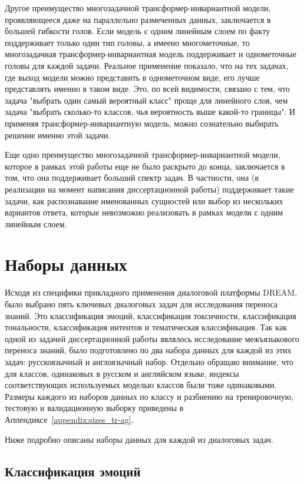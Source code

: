 Другое преимущество многозадачной трансформер-инвариантной модели, проявляющееся даже на параллельно размеченных данных, заключается в большей гибкости голов. Если модель с одним линейным слоем по факту поддерживает только один тип головы, а имеено многометочные, то многозадачная трансформер-инвариантная модель поддерживает и однометочные головы для каждой задачи. Реальное применение показало, что на тех задачах, где выход модели можно представить в однометочном виде, его лучше представлять именно  в таком виде. Это, по всей видимости, связано с тем, что задача "выбрать один самый вероятный класс" проще для линейного слоя, чем задача "выбрать сколько-то классов, чья вероятность выше какой-то границы". И применяя трансформер-инвариантную модель, можно сознательно выбирать решение именно этой задачи.

Еще одно преимущество многозадачной трансформер-инвариантной модели, которое в рамках этой работы еще не было раскрыто до конца, заключается в том, что она поддерживает больший спектр задач. В частности, она (в реализации на момент написания диссертационной работы) поддерживает такие задачи, как распознавание именованных сущностей или выбор из нескольких вариантов ответа, которые невозможно реализовать в рамках модели с одним линейным слоем.


\section{Наборы данных}

Исходя из специфики прикладного применения диалоговой платформы DREAM, было выбрано пять ключевых диалоговых задач для исследования переноса знаний. Это классификация эмоций, классификация токсичности, классификация тональности, классификация интентов и тематическая классификация. Так как одной из задачей диссертационной работы являлось исследование межъязыкового переноса знаний, было подготовлено по два набора данных для каждой из этих задач: русскоязычный и англоязычный набор. Отдельно обращаю внимание, что для классов, одинаковых в русском и английском языке, индексы соответствующих используемых моделью классов были тоже одинаковыми. Размеры каждого из наборов данных по классу и разбиению на тренировочную, тестовую и валидационную выборку приведены в Аппендиксе~\ref{appendix:sizes_tr-ag}.

Ниже подробно описаны наборы данных для каждой из диалоговых задач. 

\subsection{Классификация эмоций}
